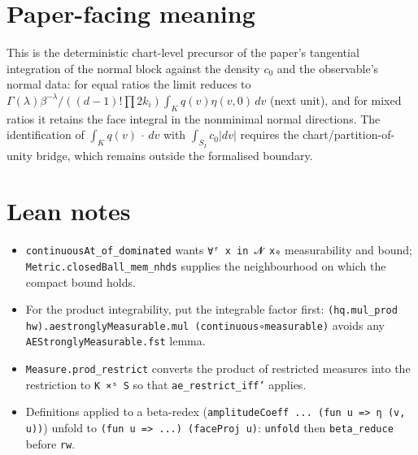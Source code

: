 \documentclass[11pt]{article}
\begin{document}
\section{Paper-facing meaning}
This is the deterministic chart-level precursor of the paper's tangential integration of the normal
block against the density $c_0$ and the observable's normal data: for equal ratios the limit reduces
to $\Gamma(\lambda)\beta^{-\lambda}/((d-1)!\prod2k_i)\int_Kq(v)\eta(v,0)\,dv$ (next unit), and for
mixed ratios it retains the face integral in the nonminimal normal directions. The identification of
$\int_Kq(v)\,\cdot\,dv$ with $\int_{S_I}c_0|dv|$ requires the chart/partition-of-unity bridge, which
remains outside the formalised boundary.

\section{Lean notes}
\begin{itemize}
\item \texttt{continuousAt\_of\_dominated} wants \texttt{∀ᶠ x in 𝓝 x₀} measurability and bound;
\texttt{Metric.closedBall\_mem\_nhds} supplies the neighbourhood on which the compact bound holds.
\item For the product integrability, put the integrable factor first:
\texttt{(hq.mul\_prod hw).aestronglyMeasurable.mul (continuous∘measurable)} avoids any
\texttt{AEStronglyMeasurable.fst} lemma.
\item \texttt{Measure.prod\_restrict} converts the product of restricted measures into the restriction
to \texttt{K ×ˢ S} so that \texttt{ae\_restrict\_iff'} applies.
\item Definitions applied to a beta-redex (\texttt{amplitudeCoeff ... (fun u => η (v, u))}) unfold to
\texttt{(fun u => ...) (faceProj u)}: \texttt{unfold} then \texttt{beta\_reduce} before \texttt{rw}.
\end{itemize}
\end{document}
